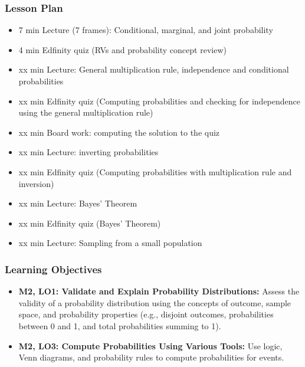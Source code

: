 \begin{frame}
    \frametitle{Lesson Plan}
    \begin{itemize}
        \item 7 min Lecture (7 frames): Conditional, marginal, and joint probability
        \item 4 min Edfinity quiz (RVs and probability concept review)
        \item xx min Lecture: General multiplication rule, independence and conditional probabilities
        \item xx min Edfinity quiz (Computing probabilities and checking for independence using the general multiplication rule)
        \item xx min Board work: computing the solution to the quiz
        \item xx min Lecture: inverting probabilities
        \item xx min Edfinity quiz (Computing probabilities with multiplication rule and inversion)
        \item xx min Lecture: Bayes' Theorem
        \item xx min Edfinity quiz (Bayes' Theorem)
        \item xx min Lecture: Sampling from a small population
    \end{itemize}
\end{frame}

\begin{frame}
    \frametitle{Learning Objectives}
    \begin{itemize}
        \item \textbf{M2, LO1: Validate and Explain Probability Distributions:} Assess the validity of a probability distribution using the concepts of outcome, sample space, and probability properties (e.g., disjoint outcomes, probabilities between 0 and 1, and total probabilities summing to 1).
        \item \textbf{M2, LO3: Compute Probabilities Using Various Tools:} Use logic, Venn diagrams, and probability rules to compute probabilities for events.
    \end{itemize}
\end{frame}

